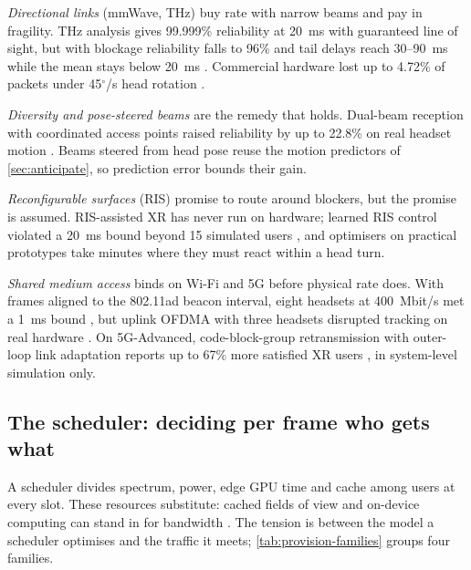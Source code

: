\emph{Directional links} (mmWave, THz) buy rate with narrow beams and pay in fragility. THz analysis
gives 99.999\% reliability at 20~ms with guaranteed line of sight, but with blockage reliability falls
to 96\% and tail delays reach 30--90~ms while the mean stays below 20~ms \cite{W3022996137}. Commercial
hardware lost up to 4.72\% of packets under 45$^\circ$/s head rotation \cite{W4401507876}.

\emph{Diversity and pose-steered beams} are the remedy that holds. Dual-beam reception with coordinated
access points raised reliability by up to 22.8\% on real headset motion \cite{W4409076649}. Beams
steered from head pose reuse the motion predictors of \cref{sec:anticipate}, so prediction error bounds
their gain.

\emph{Reconfigurable surfaces} (RIS) promise to route around blockers, but the promise is assumed.
RIS-assisted XR has never run on hardware; learned RIS control violated a 20~ms bound beyond 15
simulated users \cite{W3207401133}, and optimisers on practical prototypes take minutes
\cite{W4401507876} where they must react within a head turn.

\emph{Shared medium access} binds on Wi-Fi and 5G before physical rate does. With frames aligned to the
802.11ad beacon interval, eight headsets at 400~Mbit/s met a 1~ms bound \cite{W3081368317}, but uplink
OFDMA with three headsets disrupted tracking on real hardware \cite{W4396853623}. On 5G-Advanced,
code-block-group retransmission with outer-loop link adaptation reports up to 67\% more satisfied XR
users \cite{W4315777456}, in system-level simulation only.

\subsection{The scheduler: deciding per frame who gets what}
A scheduler divides spectrum, power, edge GPU time and cache among users at every slot. These resources
substitute: cached fields of view and on-device computing can stand in for bandwidth \cite{W2887223659}.
The tension is between the model a scheduler optimises and the traffic it meets;
\cref{tab:provision-families} groups four families.

